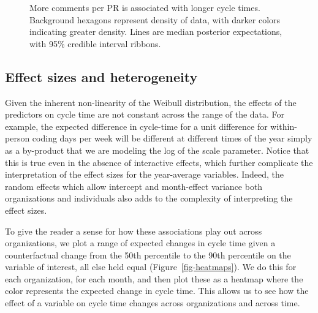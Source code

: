 \documentclass[
  sn-mathphys-ay,
]{sn-jnl}
\begin{document}
\begin{figure}


\caption[More comments per PR is associated with longer cycle
times]{\label{fig-comments}More comments per PR is associated with
longer cycle times. Background hexagons represent density of data, with
darker colors indicating greater density. Lines are median posterior
expectations, with 95\% credible interval ribbons.}

\end{figure}%

\subsection{Effect sizes and
heterogeneity}\label{effect-sizes-and-heterogeneity}

Given the inherent non-linearity of the Weibull distribution, the
effects of the predictors on cycle time are not constant across the
range of the data. For example, the expected difference in cycle-time
for a unit difference for within-person coding days per week will be
different at different times of the year simply as a by-product that we
are modeling the log of the scale parameter. Notice that this is true
even in the absence of interactive effects, which further complicate the
interpretation of the effect sizes for the year-average variables.
Indeed, the random effects which allow intercept and month-effect
variance both organizations and individuals also adds to the complexity
of interpreting the effect sizes.

To give the reader a sense for how these associations play out across
organizations, we plot a range of expected changes in cycle time given a
counterfactual change from the 50th percentile to the 90th percentile on
the variable of interest, all else held equal
(Figure~\ref{fig-heatmaps}). We do this for each organization, for each
month, and then plot these as a heatmap where the color represents the
expected change in cycle time. This allows us to see how the effect of a
variable on cycle time changes across organizations and across time.
\end{document}
